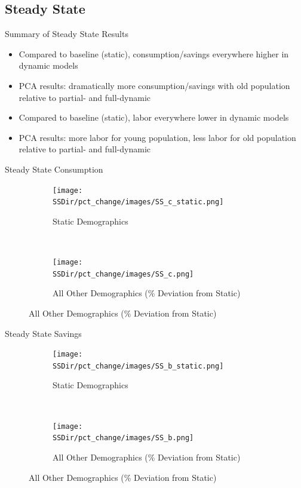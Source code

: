 \documentclass[12pt]{beamer}
\newcommand*{\SSDir}{../code/Rick/OUTPUT/SS}
\begin{document}
\subsection{Steady State}

\begin{frame}{Summary of Steady State Results}
	\begin{itemize}
		\item Compared to baseline (static), consumption/savings everywhere higher in dynamic models
		\item PCA results: dramatically more consumption/savings with old population relative to partial- and full-dynamic
		\item Compared to baseline (static), labor everywhere lower in dynamic models
		\item PCA results: more labor for young population, less labor for old population relative to partial- and full-dynamic
	\end{itemize}
\end{frame}

\begin{frame}{Steady State Consumption}

	\begin{figure}[H]
		\begin{subfigure}{0.5\textwidth}
		   \centering
		   \texttt{[image: \\SSDir/pct\_change/images/SS\_c\_static.png]}
		   \caption{Static Demographics}
		\end{subfigure}%
		~
		\begin{subfigure}{0.5\textwidth}
		   \centering
		   \texttt{[image: \\SSDir/pct\_change/images/SS\_c.png]}
		   \caption{All Other Demographics (\% Deviation from Static)}
		\end{subfigure}
	 \end{figure}

\end{frame}

\begin{frame}{Steady State Savings}

	\begin{figure}[H]
		\begin{subfigure}{0.5\textwidth}
		   \centering
		   \texttt{[image: \\SSDir/pct\_change/images/SS\_b\_static.png]}
		   \caption{Static Demographics}
		\end{subfigure}%
		~
		\begin{subfigure}{0.5\textwidth}
		   \centering
		   \texttt{[image: \\SSDir/pct\_change/images/SS\_b.png]}
		   \caption{All Other Demographics (\% Deviation from Static)}
		\end{subfigure}
	 \end{figure}

\end{frame}
\end{document}
